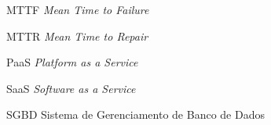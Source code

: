 

\begin{siglas} \itemsep -1pt

	\item[MTTF] \emph{Mean Time to Failure}
	\item[MTTR] \emph{Mean Time to Repair}
	\item[PaaS] \emph{Platform as a Service}
	\item[SaaS] \emph{Software as a Service}
	\item[SGBD] Sistema de Gerenciamento de Banco de Dados

\end{siglas}
